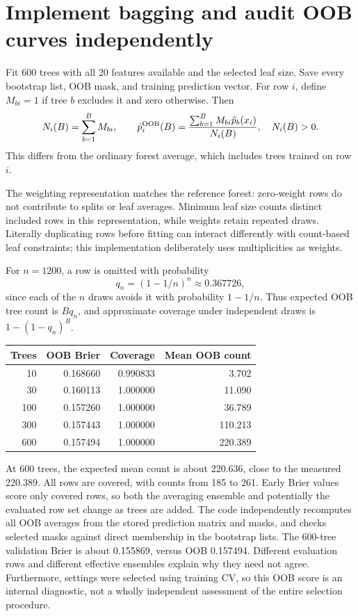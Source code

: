 \section{Implement bagging and audit OOB curves independently}
Fit 600 trees with all 20 features available and the selected leaf size. Save every bootstrap list, OOB mask, and training prediction vector. For row $i$, define $M_{bi}=1$ if tree $b$ excludes it and zero otherwise. Then
\[N_i(B)=\sum_{b=1}^B M_{bi},\qquad
\hat p_i^{\rm OOB}(B)=\frac{\sum_{b=1}^B M_{bi}\hat p_b(x_i)}{N_i(B)},\quad N_i(B)>0.\]
This differs from the ordinary forest average, which includes trees trained on row $i$.

The weighting representation matches the reference forest: zero-weight rows do not contribute to splits or leaf averages. Minimum leaf size counts distinct included rows in this representation, while weights retain repeated draws. Literally duplicating rows before fitting can interact differently with count-based leaf constraints; this implementation deliberately uses multiplicities as weights.

For $n=1200$, a row is omitted with probability
\[q_n=(1-1/n)^n\approx0.367726,\]
since each of the $n$ draws avoids it with probability $1-1/n$. Thus expected OOB tree count is $Bq_n$, and approximate coverage under independent draws is $1-(1-q_n)^B$.
\begin{center}
\begin{tabular}{rrrr}\toprule
Trees&OOB Brier&Coverage&Mean OOB count\\\midrule
10&0.168660&0.990833&3.702\\
30&0.160113&1.000000&11.090\\
100&0.157260&1.000000&36.789\\
300&0.157443&1.000000&110.213\\
600&0.157494&1.000000&220.389\\\bottomrule
\end{tabular}
\end{center}
At 600 trees, the expected mean count is about 220.636, close to the measured 220.389. All rows are covered, with counts from 185 to 261. Early Brier values score only covered rows, so both the averaging ensemble and potentially the evaluated row set change as trees are added.
The code independently recomputes all OOB averages from the stored prediction matrix and masks, and checks selected masks against direct membership in the bootstrap lists. The 600-tree validation Brier is about 0.155869, versus OOB 0.157494. Different evaluation rows and different effective ensembles explain why they need not agree. Furthermore, settings were selected using training CV, so this OOB score is an internal diagnostic, not a wholly independent assessment of the entire selection procedure.

